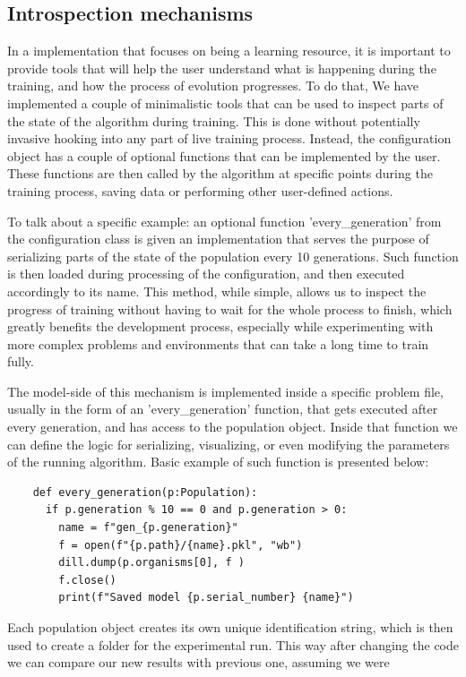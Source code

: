 \documentclass{article}
\begin{document}
    \subsection{Introspection mechanisms}
    In a implementation that focuses on being a learning resource, it is important to provide tools
    that will help the user understand what is happening during the training,
    and how the process of evolution progresses. To do that,
    We have implemented a couple of minimalistic tools that can be used to inspect parts of
    the state of the algorithm during training.
    This is done without potentially invasive hooking into any part of live training process.
    Instead, the configuration object has a couple of optional functions that can be implemented by the user.
    These functions are then called by the algorithm at specific points during the training process, saving data
    or performing other user-defined actions.
    \par To talk about a specific example: an optional function 'every\_generation' from the configuration
    class is given an implementation that serves the purpose of serializing parts of the state of the population every 10 generations.
    Such function is then loaded during processing of the configuration, and then executed accordingly to its name. 
    This method, while simple, allows us to inspect the progress of training without having to wait for the
    whole process to finish, which greatly benefits the development process, especially while experimenting with
    more complex problems and environments that can take a long time to train fully.
    \par The model-side of this mechanism is implemented inside a specific problem file, usually in the form of
    an 'every\_generation' function, that gets executed after every generation, and has access to the population object.
    Inside that function we can define the logic for serializing, visualizing, or even modifying the parameters of 
    the running algorithm. Basic example of such function is presented below:
    \begin{verbatim}
    def every_generation(p:Population):
      if p.generation % 10 == 0 and p.generation > 0:
        name = f"gen_{p.generation}"
        f = open(f"{p.path}/{name}.pkl", "wb")
        dill.dump(p.organisms[0], f )
        f.close()
        print(f"Saved model {p.serial_number} {name}")
    \end{verbatim}
    Each population object creates its own unique identification string, which is then used to create a folder for the experimental run. This way after changing the code we can compare our new results with previous one, assuming we were
\end{document}
